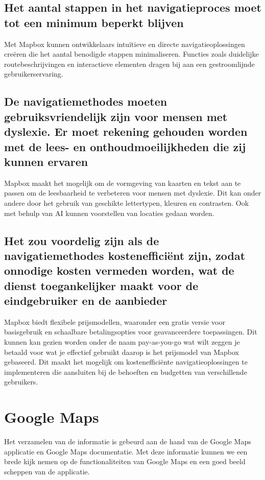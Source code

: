 \subsection*{Het aantal stappen in het navigatieproces moet tot een minimum beperkt blijven}
Met Mapbox kunnen ontwikkelaars intuïtieve en directe navigatieoplossingen creëren die het aantal benodigde stappen minimaliseren. Functies zoals duidelijke routebeschrijvingen en interactieve elementen dragen bij aan een gestroomlijnde gebruikerservaring.

\subsection*{De navigatiemethodes moeten gebruiksvriendelijk zijn voor mensen met dyslexie. Er moet rekening gehouden worden met de lees- en onthoudmoeilijkheden die zij kunnen ervaren}
Mapbox maakt het mogelijk om de vormgeving van kaarten en tekst aan te passen om de leesbaarheid te verbeteren voor mensen met dyslexie. Dit kan onder andere door het gebruik van geschikte lettertypen, kleuren en contrasten. Ook met behulp van AI kunnen voorstellen van locaties gedaan worden.

\subsection*{Het zou voordelig zijn als de navigatiemethodes kostenefficiënt zijn, zodat onnodige kosten vermeden worden, wat de dienst toegankelijker maakt voor de eindgebruiker en de aanbieder}


Mapbox biedt flexibele prijsmodellen, waaronder een gratis versie voor basisgebruik en schaalbare betalingsopties voor geavanceerdere toepassingen. Dit kunnen kan gezien worden onder de naam pay-as-you-go wat wilt zeggen je betaald voor wat je effectief gebruikt daarop is het prijsmodel van Mapbox gebaseerd. Dit maakt het mogelijk om kostenefficiënte navigatieoplossingen te implementeren die aansluiten bij de behoeften en budgetten van verschillende gebruikers. 

\section{Google Maps}
\label{sec:google maps}

Het verzamelen van de informatie is gebeurd aan de hand van de Google Maps applicatie en Google Maps documentatie. Met deze informatie kunnen we een brede kijk nemen op de functionaliteiten van Google Maps en een goed beeld scheppen van de applicatie.


